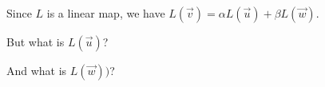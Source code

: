 \documentclass{ximera}
\begin{document}
\begin{question}
\begin{solution}
    \begin{hint}
      Since $L$ is a linear map, we have $L(\vec{v}) = \alpha L(\vec{u}) + \beta L(\vec{w})$.
    \end{hint}

    \begin{multiple-choice}
    \end{multiple-choice} 
  \end{solution}

  \begin{solution}
    \begin{hint}
      \begin{question}
        \begin{solution}
          But what is $L(\vec{u})$?

          \begin{multiple-choice}
          \end{multiple-choice} 
        \end{solution}
      \end{question}
    \end{hint}

    \begin{hint}
      \begin{question}
        \begin{solution}
          And what is $L(\vec{w}))$?

          \begin{multiple-choice}
          \end{multiple-choice} 
        \end{solution}
      \end{question}
    \end{hint}


\end{solution}
\end{question}
\end{document}
